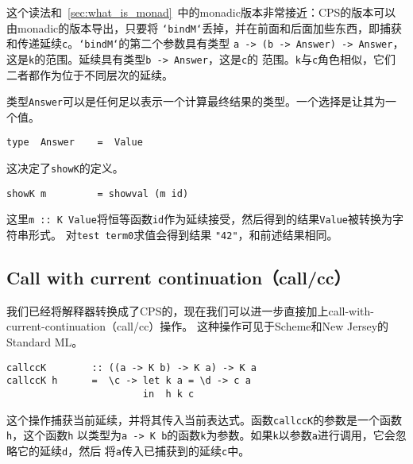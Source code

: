 \documentclass[12pt]{article}
\begin{document}
\indent{}这个读法和~\ref{sec:what_is_monad}~中的monadic版本非常接近：CPS的版本可以由monadic的版本导出，只要将
\texttt{`bindM`}丢掉，并在前面和后面加些东西，即捕获和传递延续\texttt{c}。\texttt{`bindM`}的第二个参数具有类型
\texttt{a -> (b -> Answer) -> Answer}，这是\texttt{k}的范围。延续具有类型\texttt{b -> Answer}，这是\texttt{c}的
范围。\texttt{k}与\texttt{c}角色相似，它们二者都作为位于不同层次的延续。

\indent{}类型\texttt{Answer}可以是任何足以表示一个计算最终结果的类型。一个选择是让其为一个值。
\begin{verbatim}
type  Answer    =  Value
\end{verbatim}
\noindent{}这决定了\texttt{showK}的定义。
\begin{verbatim}
showK m         = showval (m id)
\end{verbatim}
\noindent{}这里\texttt{m :: K Value}将恒等函数\texttt{id}作为延续接受，然后得到的结果\texttt{Value}被转换为字符串形式。
对\texttt{test term0}求值会得到结果 \texttt{"42"}，和前述结果相同。

\subsection{Call with current continuation（call/cc）}
\indent{}我们已经将解释器转换成了CPS的，现在我们可以进一步直接加上call-with-current-continuation（call/cc）操作。
这种操作可见于Scheme和New Jersey的Standard ML。
\begin{verbatim}
callccK        :: ((a -> K b) -> K a) -> K a
callccK h      =  \c -> let k a = \d -> c a
                        in  h k c
\end{verbatim}
\noindent{}这个操作捕获当前延续，并将其传入当前表达式。函数\texttt{callccK}的参数是一个函数\texttt{h}，这个函数\texttt{h}
以类型为\texttt{a -> K b}的函数\texttt{k}为参数。如果\texttt{k}以参数\texttt{a}进行调用，它会忽略它的延续\texttt{d}，然后
将\texttt{a}传入已捕获到的延续\texttt{c}中。
\end{document}
